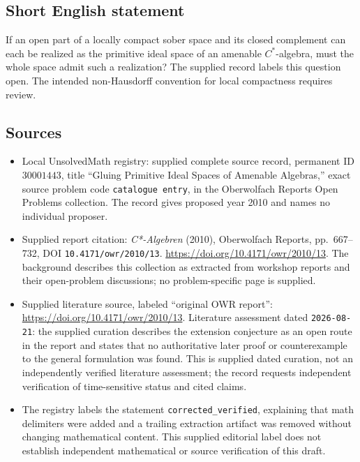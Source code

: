 \documentclass[11pt]{article}
\begin{document}
\subsection{Short English statement}
If an open part of a locally compact sober space and its closed complement can each be realized as the primitive ideal space of an amenable \(C^*\)-algebra, must the whole space admit such a realization? The supplied record labels this question open. The intended non-Hausdorff convention for local compactness requires review.
\subsection{Sources}
\begin{itemize}
\item Local UnsolvedMath registry: supplied complete source record, permanent ID \(30001443\), title ``Gluing Primitive Ideal Spaces of Amenable Algebras,'' exact source problem code \texttt{catalogue entry}, in the Oberwolfach Reports Open Problems collection. The record gives proposed year 2010 and names no individual proposer.
\item Supplied report citation: \emph{C*-Algebren} (2010), Oberwolfach Reports, pp.~667--732, DOI \texttt{10.4171/owr/2010/13}. \url{https://doi.org/10.4171/owr/2010/13}. The background describes this collection as extracted from workshop reports and their open-problem discussions; no problem-specific page is supplied.
\item Supplied literature source, labeled ``original OWR report'': \url{https://doi.org/10.4171/owr/2010/13}. Literature assessment dated \texttt{2026-08-21}: the supplied curation describes the extension conjecture as an open route in the report and states that no authoritative later proof or counterexample to the general formulation was found. This is supplied dated curation, not an independently verified literature assessment; the record requests independent verification of time-sensitive status and cited claims.
\item The registry labels the statement \texttt{corrected\_verified}, explaining that math delimiters were added and a trailing extraction artifact was removed without changing mathematical content. This supplied editorial label does not establish independent mathematical or source verification of this draft.
\end{itemize}
\end{document}
